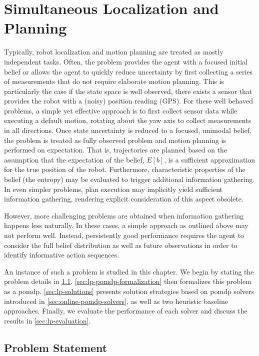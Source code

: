 \chapter{Simultaneous Localization and Planning}\label{chap:localization-and-planning}

Typically, robot localization and motion planning are treated as mostly
independent tasks. Often, the problem provides the agent with a focused initial
belief or allows the agent to quickly reduce uncertainty by first collecting
a series of measurements that do not require elaborate motion planning. This is
particularly the case if the state space is well observed, \ie there exists
a sensor that provides the robot with a (noisy) position reading (\eg GPS).
For these well behaved problems, a simple yet effective approach is to first
collect sensor data while executing a default motion, \ie rotating about the
yaw axis to collect measurements in all directions. Once state uncertainty is
reduced to a focused, unimodal belief, the problem is treated as fully observed
problem and motion planning is performed on expectation. That is, trajectories
are planned based on the assumption that the expectation of the belief, $E[b]$,
is a sufficient approximation for the true position of the robot. Furthermore,
characteristic properties of the belief (\eg the entropy) may be evaluated
to trigger additional information gathering. In even simpler problems, plan
execution may implicitly yield sufficient information gathering, rendering
explicit consideration of this aspect obsolete.

However, more challenging problems are obtained when information gathering
happens less naturally. In these cases, a simple approach as outlined above
may not perform well. Instead, persistently good performance requires the agent
to consider the full belief distribution as well as future observations in
order to identify informative action sequences.

An instance of such a problem is studied in this chapter. We begin by stating
the problem details in \cref{sec:lp-problem-statement}.
\cref{sec:lp-pomdp-formalization} then formalizes this problem as a \ac{pomdp}.
\cref{sec:lp-solutions} presents solution strategies based on \ac{pomdp}
solvers introduced in \cref{sec:online-pomdp-solvers}, as well as two heuristic
baseline approaches. Finally, we evaluate the performance of each solver and
discuss the results in \cref{sec:lp-evaluation}.

\section{Problem Statement}\label{sec:lp-problem-statement}

